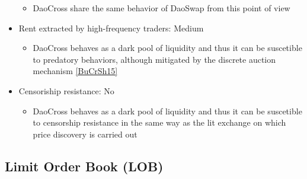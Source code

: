 \documentclass[11pt, reqno]{amsart}
\theoremstyle{definition}
\theoremstyle{remark}
\begin{document}
\begin{itemize}
	      \begin{itemize}
		      \item DaoCross share the same behavior of DaoSwap from this point of view
	      \end{itemize}
	\item Rent extracted by high-frequency traders: Medium
	      \begin{itemize}
              \item DaoCross behaves as a dark pool of liquidity and thus it can be suscetible
                to predatory behaviors, although mitigated by the discrete auction mechanism
                \ref{BuCrSh15}
	      \end{itemize}
	\item Censoriship resistance: No
	      \begin{itemize}
              \item DaoCross behaves as a dark pool of liquidity and thus it can be suscetible
                to censorship resistance in the same way as the lit exchange on which
                price discovery is carried out
	      \end{itemize}
\end{itemize}

\subsection{Limit Order Book (LOB)}
\end{document}
